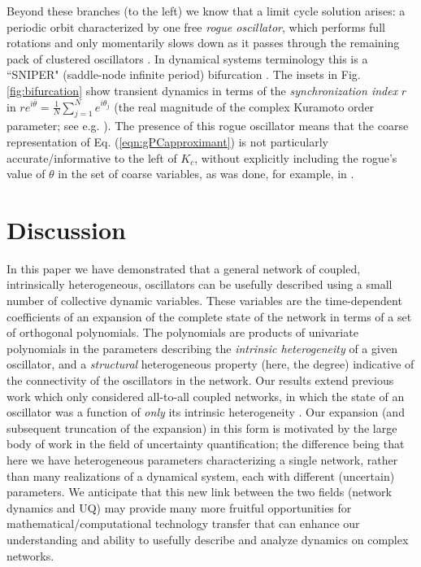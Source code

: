 \documentclass[numbers]{frontiersSCNS}
\newcommand{\numNodes}{{N}}
\newcommand{\couplingK}{{K}}
\newcommand{\avgPhase}{{\bar{\theta}}}
\newcommand{\SI}{r}
\newcommand{\figRef}[1]{Fig. \ref{fig:#1}}
\newcommand{\eqnRef}[1]{Eq. (\ref{eqn:#1})}
\newcommand{\wordDefn}[1]{\emph{#1}}
\begin{document}
Beyond these branches (to the left) we know that a limit cycle solution
arises:  a periodic orbit characterized by one free \wordDefn{rogue oscillator},
which performs full rotations and only momentarily slows down as it passes through 
the remaining
pack of clustered oscillators \cite{Moon2005}.
%
In dynamical systems terminology this is a ``SNIPER" (saddle-node infinite period) 
bifurcation \cite{Strogatz2001}.
%
The insets in \figRef{bifurcation} show transient dynamics
in terms of the \wordDefn{synchronization index} $\SI$ in
$\SI e^{i\avgPhase} = \frac{1}{\numNodes}\sum_{j=1}^\numNodes e^{i \theta_j}$
(the real magnitude of the complex Kuramoto order parameter; see e.g. \cite{Skardal2011}).
%
The presence of this rogue oscillator means that
the coarse representation of \eqnRef{gPCapproximant}
is not particularly accurate/informative to the left of $\couplingK_c$,
without explicitly including the rogue's value of $\theta$
in the set of coarse variables,
as was done, for example, in \cite{Moon2006}.







\section{Discussion}

In this paper we have demonstrated that a general network of coupled, intrinsically heterogeneous, oscillators
can be usefully described using a small number of collective dynamic variables. 
%
These variables are the
time-dependent coefficients of an expansion
of the complete state of the network in terms of a set of orthogonal polynomials. 
%
The polynomials are products of
univariate polynomials in the parameters describing the \emph{intrinsic heterogeneity} of a given oscillator, 
and a \emph{structural} heterogeneous property (here, the degree) 
indicative of the connectivity of the oscillators in the network.
%
Our results extend previous work which
only considered all-to-all coupled networks, in which the state of
an oscillator was a function of {\em only} its intrinsic heterogeneity \cite{Moon2006,Laing2016}.
%
Our expansion (and subsequent truncation of the expansion) in this form
is motivated by the large body of work in the field of uncertainty
quantification; the difference being that here we have heterogeneous parameters characterizing a single network,
rather than many realizations of a dynamical system, each with different (uncertain) parameters.
%
We anticipate that this new link between the two fields (network dynamics and UQ) may provide
many more fruitful opportunities for mathematical/computational technology transfer that 
can enhance our understanding and ability to usefully describe and analyze dynamics on complex networks.
\end{document}
